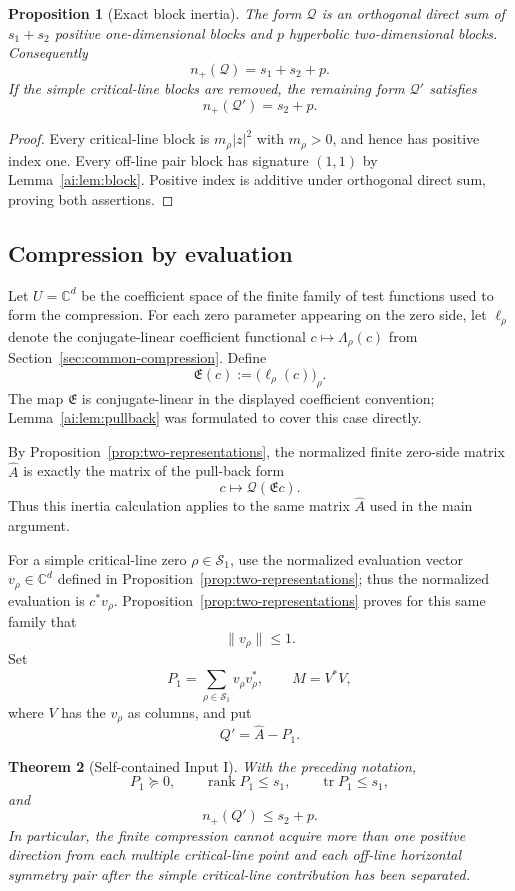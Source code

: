 \documentclass[11pt]{article}
\newtheorem{theorem}{Theorem}[section]
\newtheorem{proposition}[theorem]{Proposition}
\DeclareMathOperator{\tr}{tr}
\DeclareMathOperator{\rank}{rank}
\newcommand{\C}{\mathbb C}
\newcommand{\cS}{\mathcal S}
\begin{document}
\begin{proposition}[Exact block inertia]\label{ai:prop:Qinertia}
The form $\mathcal Q$ is an orthogonal direct sum of
$s_1+s_2$ positive one-dimensional blocks and $p$ hyperbolic two-dimensional
blocks.  Consequently
\[
 n_+(\mathcal Q)=s_1+s_2+p.
\]
If the simple critical-line blocks are removed, the remaining form
$\mathcal Q'$ satisfies
\[
 n_+(\mathcal Q')=s_2+p.
\]
\end{proposition}

\begin{proof}
Every critical-line block is $m_\rho|z|^2$ with $m_\rho>0$, and hence has
positive index one.  Every off-line pair block has signature $(1,1)$ by
Lemma~\ref{ai:lem:block}.  Positive index is additive under orthogonal direct
sum, proving both assertions.
\end{proof}

\subsection{Compression by evaluation}

Let $U=\C^d$ be the coefficient space of the finite family of test functions
used to form the compression.  For each zero parameter appearing on the zero side, let
$\ell_\rho$ denote the conjugate-linear coefficient functional
$c\mapsto\Lambda_\rho(c)$ from
Section~\ref{sec:common-compression}.  Define
\[
 \mathfrak E(c):=\bigl(\ell_\rho(c)\bigr)_\rho .
\]
The map $\mathfrak E$ is conjugate-linear in the displayed coefficient
convention; Lemma~\ref{ai:lem:pullback} was formulated to cover this case
directly.

By Proposition~\ref{prop:two-representations}, the normalized finite
zero-side matrix $\widehat A$ is exactly the matrix of the pull-back form
\[
 c\longmapsto \mathcal Q(\mathfrak E c).
\]
Thus this inertia calculation applies to the same matrix $\widehat A$ used in
the main argument.

For a simple critical-line zero $\rho\in\cS_1$, use the normalized
evaluation vector $v_\rho\in\C^d$ defined in
Proposition~\ref{prop:two-representations}; thus the normalized evaluation is
$c^*v_\rho$.
Proposition~\ref{prop:two-representations} proves for this same family that
\[
 \|v_\rho\|\le1.
\]
Set
\[
 P_1=\sum_{\rho\in\cS_1}v_\rho v_\rho^*,
 \qquad
 M=V^*V,
\]
where $V$ has the $v_\rho$ as columns, and put
\[
 Q'=\widehat A-P_1.
\]

\begin{theorem}[Self-contained Input I]\label{ai:thm:InputI}
With the preceding notation,
\[
 P_1\succeq0,\qquad
 \rank P_1\le s_1,\qquad
 \tr P_1\le s_1,
\]
and
\[
 n_+(Q')\le s_2+p.
\]
In particular, the finite compression cannot acquire more than one positive
direction from each multiple critical-line point and each off-line
horizontal symmetry pair after the simple critical-line contribution has
been separated.
\end{theorem}
\end{document}
